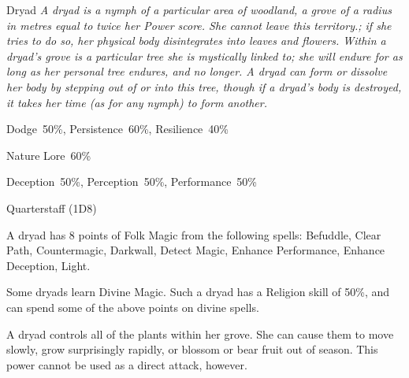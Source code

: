 \begin{monsterbox}{Dryad}
	\textit{A dryad is a nymph of a particular area of woodland, a grove of a radius in metres equal to twice her Power score. She cannot leave this territory.; if she tries to do so, her physical body disintegrates into leaves and flowers. Within a dryad’s grove is a particular tree she is mystically linked to; she will endure for as long as her personal tree endures, and no longer. A dryad can form or dissolve her body by stepping out of or into this tree, though if a dryad’s body is destroyed, it takes her time (as for any nymph) to form another.}\\
	\rpghline
	\basics[%
        hitpoints  = 11, 
	majorwound = 6,
	damagemodifier = 0,
	powerpoints = 22,
	movementrate = 15m,
	armor = None,
	plunderrating = 1
	]
	\rpghline%
	\stats[ %
		STR = 2D6    (7),
		CON = 3D6    (11),
		DEX = 4D6    (14),
		SIZ = 2D6+3  (10),
		INT = 3D6+6  (17),
		POW = 2D6+15 (22),
		CHA = 2D6+12 (19)
	]
	\rpghline%
	\begin{rpg-monsteraction}[Resistances]
		Dodge~50\%, Persistence~60\%, Resilience~40\%
	\end{rpg-monsteraction}
	\begin{rpg-monsteraction}[Knowledge]
		Nature Lore~60\%
	\end{rpg-monsteraction}
	\begin{rpg-monsteraction}[Practical]
		Deception~50\%, Perception~50\%, Performance~50\%
	\end{rpg-monsteraction}
	\begin{rpg-monsteraction}
		Quarterstaff (1D8)
	\end{rpg-monsteraction}
	\begin{rpg-monsteraction}
		A dryad has 8 points of Folk Magic from the following spells: Befuddle, Clear Path, Countermagic, Darkwall, Detect Magic, Enhance Performance, Enhance Deception, Light.
	\end{rpg-monsteraction}
	\begin{rpg-monsteraction}
		Some dryads learn Divine Magic. Such a dryad has a Religion skill of 50\%, and can spend some of the above points on divine spells. 
	\end{rpg-monsteraction}
	\begin{rpg-monsteraction}
		A dryad controls all of the plants within her grove. She can cause them to move slowly, grow surprisingly rapidly, or blossom or bear fruit out of season. This power cannot be used as a direct attack, however.
	\end{rpg-monsteraction}

\end{monsterbox}


